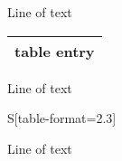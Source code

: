 \documentclass[main]{subfiles}
\begin{document}
Line of text

\begin{tabular}{l}
  \hline
  table entry\\
  \hline
\end{tabular}

Line of text

\begin{tabular}{S[table-format=2.3]}
  \\
  \hline
\end{tabular}

Line of text
\end{document}
